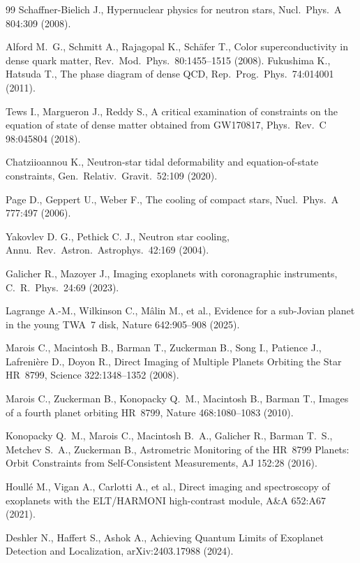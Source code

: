 \begin{thebibliography}{99}
Schaffner-Bielich J., Hypernuclear physics for neutron stars, Nucl.\ Phys.\ A 804:309 (2008).

Alford M.~G., Schmitt A., Rajagopal K., Sch\"afer T., Color superconductivity in dense quark matter,
Rev.\ Mod.\ Phys.\ 80:1455--1515 (2008).
Fukushima K., Hatsuda T., The phase diagram of dense QCD, Rep.\ Prog.\ Phys.\ 74:014001 (2011).

Tews I., Margueron J., Reddy S., A critical examination of constraints on the equation of state of dense matter obtained from GW170817, Phys.\ Rev.\ C 98:045804 (2018).

Chatziioannou K., Neutron-star tidal deformability and equation-of-state constraints, Gen.\ Relativ.\ Gravit.\ 52:109 (2020).

Page D., Geppert U., Weber F., The cooling of compact stars, Nucl.\ Phys.\ A 777:497 (2006).

Yakovlev D. G., Pethick C. J., Neutron star cooling, Annu.\ Rev.\ Astron.\ Astrophys.\ 42:169 (2004).

Galicher R., Mazoyer J., Imaging exoplanets with coronagraphic instruments, C.\ R.\ Phys.\ 24:69 (2023).

Lagrange A.-M., Wilkinson C., Mâlin M., et al.,
Evidence for a sub-Jovian planet in the young TWA~7 disk,
Nature 642:905--908 (2025).

Marois C., Macintosh B., Barman T., Zuckerman B., Song I.,
Patience J., Lafrenière D., Doyon R.,
Direct Imaging of Multiple Planets Orbiting the Star HR~8799,
Science 322:1348--1352 (2008).

Marois C., Zuckerman B., Konopacky Q.~M., Macintosh B., Barman T.,
Images of a fourth planet orbiting HR~8799,
Nature 468:1080--1083 (2010).

Konopacky Q.~M., Marois C., Macintosh B.~A., Galicher R.,
Barman T.~S., Metchev S.~A., Zuckerman B.,
Astrometric Monitoring of the HR~8799 Planets:
Orbit Constraints from Self-Consistent Measurements,
AJ 152:28 (2016).

Houll\'e M., Vigan A., Carlotti A., et al., Direct imaging and spectroscopy of exoplanets with the ELT/HARMONI high-contrast module, A\&A 652:A67 (2021).

Deshler N., Haffert S., Ashok A., Achieving Quantum Limits of Exoplanet Detection and Localization, arXiv:2403.17988 (2024).


\end{thebibliography}
